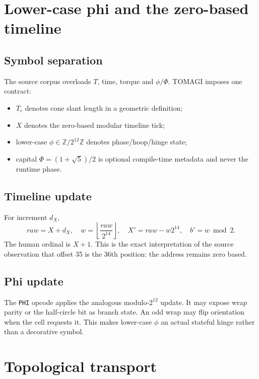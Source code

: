 \documentclass[11pt,a4paper]{article}
\newcommand{\code}[1]{\texttt{#1}}
\begin{document}
\section{Lower-case phi and the zero-based timeline}

\subsection{Symbol separation}
The source corpus overloads $T$, time, torque and $\phi/\Phi$. TOMAGI imposes one contract:
\begin{itemize}
\item $T_c$ denotes cone slant length in a geometric definition;
\item $X$ denotes the zero-based modular timeline tick;
\item lower-case $\phi\in\mathbb{Z}/2^{12}\mathbb{Z}$ denotes phase/hoop/hinge state;
\item capital $\Phi=(1+\sqrt5)/2$ is optional compile-time metadata and never the runtime phase.
\end{itemize}

\subsection{Timeline update}
For increment $d_X$,
\begin{equation}
raw=X+d_X,
\quad
w=\left\lfloor\frac{raw}{2^{14}}\right\rfloor,
\quad
X'=raw-w2^{14},
\quad
b'=w\bmod2.
\end{equation}
The human ordinal is $X+1$. This is the exact interpretation of the source observation that offset 35 is the 36th position: the address remains zero based.

\subsection{Phi update}
The \code{PHI} opcode applies the analogous modulo-$2^{12}$ update. It may expose wrap parity or the half-circle bit as branch state. An odd wrap may flip orientation when the cell requests it. This makes lower-case $\phi$ an actual stateful hinge rather than a decorative symbol.

\section{Topological transport}
\end{document}
